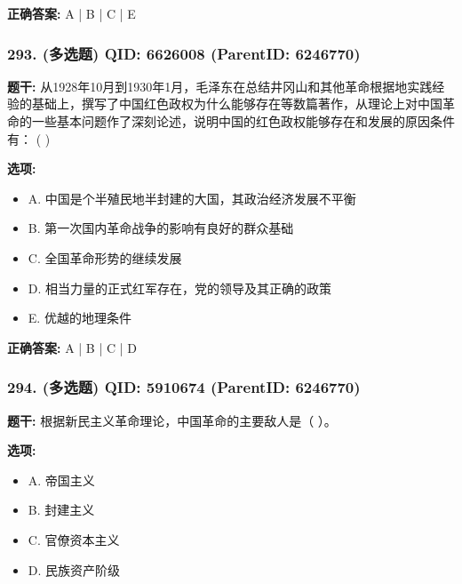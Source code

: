 \documentclass[12pt,UTF8]{ctexart}
\begin{document}
\textbf{正确答案:}
A | B | C | E

\vspace{0.3em}\hrulefill\vspace{0.7em}

\subsubsection*{293. (多选题) \small QID: 6626008 (ParentID: 6246770)}

\textbf{题干:}
从1928年10月到1930年1月，毛泽东在总结井冈山和其他革命根据地实践经验的基础上，撰写了中国红色政权为什么能够存在等数篇著作，从理论上对中国革命的一些基本问题作了深刻论述，说明中国的红色政权能够存在和发展的原因条件有： ( )



\textbf{选项:}
\begin{itemize}[leftmargin=*]

  \item A. 中国是个半殖民地半封建的大国，其政治经济发展不平衡

  \item B. 第一次国内革命战争的影响有良好的群众基础

  \item C. 全国革命形势的继续发展

  \item D. 相当力量的正式红军存在，党的领导及其正确的政策

  \item E. 优越的地理条件

\end{itemize}

\textbf{正确答案:}
A | B | C | D

\vspace{0.3em}\hrulefill\vspace{0.7em}

\subsubsection*{294. (多选题) \small QID: 5910674 (ParentID: 6246770)}

\textbf{题干:}
根据新民主义革命理论，中国革命的主要敌人是（ ）。



\textbf{选项:}
\begin{itemize}[leftmargin=*]

  \item A. 帝国主义

  \item B. 封建主义

  \item C. 官僚资本主义

  \item D. 民族资产阶级

\end{itemize}
\end{document}
